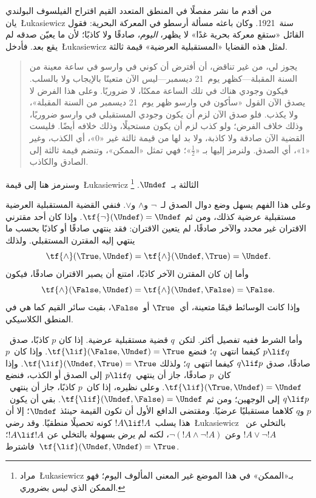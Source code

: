 \documentclass[../../../include/open-logic-section]{subfiles}
\begin{document}


من أقدم ما نشر مفصلًا في المنطق المتعدد القيم اقتراح الفيلسوف
البولندي يان~\L ukasiewicz سنة~1921. وكان باعثه مسألة أرسطو في
المعركة البحرية: فقول القائل «ستقع معركة بحرية غدًا» لا يظهر،
\emph{اليوم}، صادقًا ولا كاذبًا؛ لأن ما يعيّن صدقه لم يقع بعد.
فأدخل~\L ukasiewicz لمثل هذه القضايا «المستقبلية العرضية» قيمة ثالثة.
\begin{quote}
يجوز لي، من غير تناقض، أن أفترض أن كوني في وارسو في ساعة معينة من
السنة المقبلة---كظهر يوم~21 ديسمبر---ليس الآن متعينًا بالإيجاب ولا
بالسلب. فيكون وجودي هناك في تلك الساعة ممكنًا، لا ضروريًا. وعلى هذا
الفرض لا يصدق الآن القول «سأكون في وارسو ظهر يوم~21 ديسمبر من السنة
المقبلة»، ولا يكذب. فلو صدق الآن لزم أن يكون وجودي المستقبلي في وارسو
ضروريًا، وذلك خلاف الفرض؛ ولو كذب لزم أن يكون مستحيلًا، وذلك خلافه
أيضًا. فليست القضية الآن صادقة ولا كاذبة، ولا بد لها من قيمة ثالثة
غير «$0$»، أي الكذب، وغير «$1$»، أي الصدق. ولنرمز إليها بـ
«$\frac{1}{2}$»؛ فهي تمثل «الممكن»، وتنضم قيمة ثالثة إلى الصادق
والكاذب.
\end{quote}
وسنرمز هنا إلى قيمة~\L ukasiewicz الثالثة بـ~$\Undef$.
\footnote{مراد~\L ukasiewicz بـ«الممكن» في هذا الموضع غير المعنى
المألوف اليوم؛ فهو الممكن الذي ليس بضروري.}

وعلى هذا الفهم يسهل وضع دوال الصدق لـ~$\lnot$ و$\land$ و$\lor$.
فنفي القضية المستقبلية العرضية مستقبلية عرضية كذلك، ومن ثم
$\tf{\lnot}(\Undef) = \Undef$. وإذا كان أحد مقترني الاقتران غير
محدد والآخر صادقًا، لم يتعين الاقتران: فقد ينتهي صادقًا أو كاذبًا
بحسب ما ينتهي إليه المقترن المستقبلي. ولذلك
\[
    \tf{\land}(\True, \Undef) =
\tf{\land}(\Undef, \True) =
\Undef.
\]
وأما إن كان المقترن الآخر كاذبًا، امتنع أن يصير الاقتران صادقًا،
فيكون
\[\tf{\land}(\False, \Undef) =
\tf{\land}(\Undef, \False) = \False.\]
وإذا كانت الوسائط قيمًا متعينة، أي~$\True$ أو~$\False$، بقيت سائر
القيم كما هي في المنطق الكلاسيكي.

وأما الشرط ففيه تفصيل أكثر. لتكن~$q$ قضية مستقبلية عرضية. إذا كان
$p$ كاذبًا، صدق~$p \lif q$ كيفما انتهى~$q$؛ فنضع
$\tf{\lif}(\False, \Undef) = \True$. وإذا كان~$p$ صادقًا، صدق
$q \lif p$ كيفما انتهى~$q$؛ ولذلك
$\tf{\lif}(\Undef, \True) = \True$. وإذا كان~$p$ صادقًا، جاز أن
ينتهي~$p \lif q$ إلى الصدق أو الكذب، فنضع
$\tf{\lif}(\True, \Undef) = \Undef$. وعلى نظيره، إذا كان~$p$
كاذبًا، جاز أن ينتهي~$q \lif p$ إلى الوجهين؛ ومن ثم
$\tf{\lif}(\Undef, \False) = \Undef$. بقي أن يكون~$p$ و$q$
كلاهما مستقبليًا عرضيًا. ومقتضى الدافع الأول أن تكون القيمة حينئذ
$\Undef$؛ إلا أن هذا يسلب~$!A \lif !A$ كونه تحصيلًا منطقيًا.
وقد رضي~\L ukasiewicz بالتخلي عن~$!A \lor \lnot !A$ وعن
$\lnot(!A \land \lnot !A)$، لكنه لم يرض بسهولة بالتخلي عن
$!A \lif !A$؛ فاشترط~$\tf{\lif}(\Undef, \Undef) = \True$.
\end{document}
